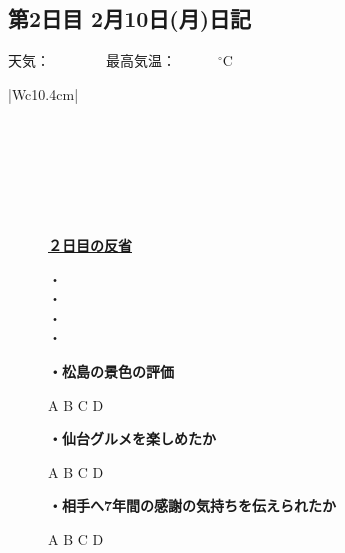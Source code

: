 \newpage

\subsection*{第2日目 2月10日(月)日記}
\vspace{0.5cm}
\centering
{}
\vspace{0.25cm}

\begin{rightline}
	{\scriptsize{天気：　　　　最高気温：　　　$ {}^\circ $C}}
\end{rightline}
\begin{table}[H]
	\centering
	\begin{tabular}{|Wc{10.4cm}|} \hline
		\\ \hline
		\\ \hline
		\\ \hline
		\\ \hline
		\\ \hline
		\\ \hline
		\\ \hline
	\end{tabular}
\end{table}

\begin{figure}[H]
	\begin{minipage}[b]{0.45\hsize}
		\begin{boxnote}
			\vspace{-0.2cm}
			\begin{center}
				\underline{\footnotesize{\textbf{２日目の反省}}}
			\end{center}
			\vspace{-0.4cm}
			
			\fontsize{12pt}{25pt}\selectfont
			・\\
			・\\
			・\\
			・
		\end{boxnote}
	\end{minipage}
	\hfill
	\begin{minipage}[b]{0.45\hsize}
		\begin{screen}
			\vspace{0.5cm}
			\scriptsize{\textbf{・松島の景色の評価}}
			\begin{center}
				A \quad B \quad C \quad D
			\end{center}
			\scriptsize{\textbf{・仙台グルメを楽しめたか}}
			\begin{center}
				A \quad B \quad C \quad D
			\end{center}
			\tiny{\textbf{・相手へ7年間の感謝の気持ちを伝えられたか}}
			\begin{center}
				\scriptsize{A \quad B \quad C \quad D}
			\end{center}
			\vspace{0.05cm}
		\end{screen}
	\end{minipage}
\end{figure}

